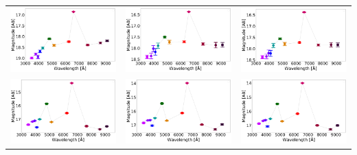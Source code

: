 \begin{table}
\begin{tabular}{ccc}
\includegraphics[width=0.3\linewidth, clip]{photopectrum_splus_MC0115-063029_aper.pdf} & \includegraphics[width=0.3\linewidth, clip]{photopectrum_splus_MC0115-063029_auto.pdf} & \includegraphics[width=0.3\linewidth, clip]{photopectrum_splus_MC0115-063029_petro.pdf} \\
\includegraphics[width=0.3\linewidth, clip]{photopectrum_splus_MC0115-105523_aper.pdf} & \includegraphics[width=0.3\linewidth, clip]{photopectrum_splus_MC0115-105523_auto.pdf} & \includegraphics[width=0.3\linewidth, clip]{photopectrum_splus_MC0115-105523_petro.pdf} \\

\end{tabular}
\end{table}
